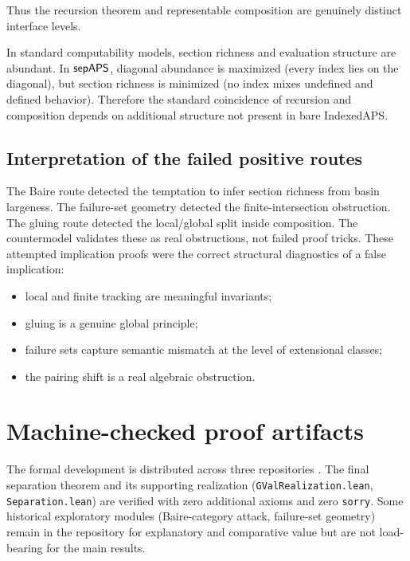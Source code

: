 \documentclass[11pt]{article}
\begin{document}
Thus the recursion theorem and representable composition are genuinely distinct interface levels.

In standard computability models, section richness and evaluation structure are abundant.  In \(\mathsf{sepAPS}\), diagonal abundance is maximized (every index lies on the diagonal), but section richness is minimized (no index mixes undefined and defined behavior).  Therefore the standard coincidence of recursion and composition depends on additional structure not present in bare IndexedAPS.

\subsection{Interpretation of the failed positive routes}

The Baire route detected the temptation to infer section richness from basin largeness.  The failure-set geometry detected the finite-intersection obstruction.  The gluing route detected the local/global split inside composition.  The countermodel validates these as real obstructions, not failed proof tricks.  These attempted implication proofs were the correct structural diagnostics of a false implication:
\begin{itemize}[leftmargin=2em]
\item local and finite tracking are meaningful invariants;
\item gluing is a genuine global principle;
\item failure sets capture semantic mismatch at the level of extensional classes;
\item the pairing shift is a real algebraic obstruction.
\end{itemize}

\section{Machine-checked proof artifacts}\label{sec:artifact}

The formal development is distributed across three repositories \cite{PhaseI,PhaseII,PhaseIII}.  The final separation theorem and its supporting realization (\texttt{GValRealization.lean}, \texttt{Separation.lean}) are verified with zero additional axioms and zero \texttt{sorry}.  Some historical exploratory modules (Baire-category attack, failure-set geometry) remain in the repository for explanatory and comparative value but are not load-bearing for the main results.

\end{document}
